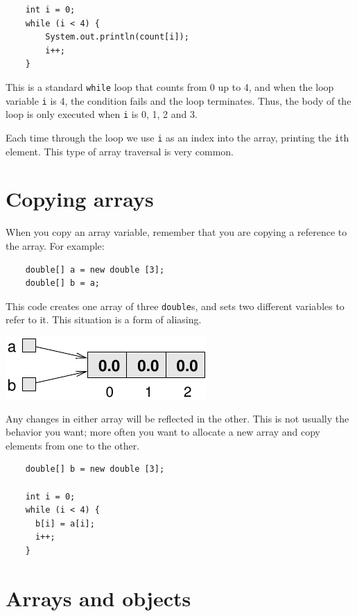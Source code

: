 \documentclass[12pt]{book}
\theoremstyle{exercise}
\begin{document}
\begin{lstlisting}
    int i = 0;
    while (i < 4) {
        System.out.println(count[i]);
        i++;
    }
\end{lstlisting}
%
This is a standard {\tt while} loop that counts from 0
up to 4, and when the loop variable {\tt i} is 4, the
condition fails and the loop terminates.  Thus, the body
of the loop is only executed when {\tt i} is 0, 1, 2 and 3.


Each time through the loop we use {\tt i} as an index into
the array, printing the {\tt i}th element.  This type of
array traversal is very common.


\section{Copying arrays}

When you copy an array variable, remember that you are
copying a reference to the array.  For example:

\begin{lstlisting}
    double[] a = new double [3];
    double[] b = a;
\end{lstlisting}
%
This code creates one array of three {\tt double}s, and
sets two different variables to refer to it.
This situation is a form of aliasing.


\includegraphics{figs/array3.pdf}


Any changes in either array
will be reflected in the other.  This is not usually the
behavior you want; more often you want to
allocate a new array and copy elements from
one to the other.

\begin{lstlisting}
    double[] b = new double [3];

    int i = 0;
    while (i < 4) {
      b[i] = a[i];
      i++;
    }
\end{lstlisting}


\section{Arrays and objects}
\end{document}

